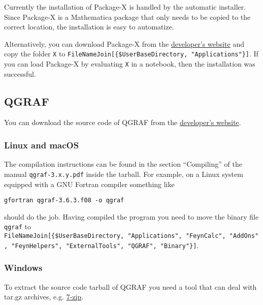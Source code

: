 \documentclass[../FeynHelpersManual.tex]{subfiles}
\begin{document}
Currently the installation of Package-X is handled by the automatic
installer. Since Package-X is a Mathematica package that only needs to
be copied to the correct location, the installation is easy to
automatize.

Alternatively, you can download Package-X from the
\href{https://packagex.hepforge.org/}{developer's website} and copy the
folder \texttt{X} to
\texttt{FileNameJoin[\allowbreak{}\{\allowbreak{}\$UserBaseDirectory,\ \allowbreak{}"Applications"\}]}.
If you can load Package-X by evaluating \texttt{X\textasciigrave } in a
notebook, then the installation was successful.

\hypertarget{qgraf}{%
\subsection{QGRAF}\label{qgraf}}

You can download the source code of QGRAF from the
\href{http://cfif.ist.utl.pt/~paulo/qgraf.html}{developer's website}.

\hypertarget{linux-and-macos}{%
\subsubsection{Linux and macOS}\label{linux-and-macos}}

The compilation instructions can be found in the section ``Compiling''
of the manual \texttt{qgraf-3.x.y.pdf} inside the tarball. For example,
on a Linux system equipped with a GNU Fortran compiler something like

\begin{verbatim}
gfortran qgraf-3.6.3.f08 -o qgraf
\end{verbatim}

should do the job. Having compiled the program you need to move the
binary file \texttt{qgraf} to
\texttt{FileNameJoin[\allowbreak{}\{\allowbreak{}\$UserBaseDirectory,\ \allowbreak{}"Applications",\ \allowbreak{}"FeynCalc",\ \allowbreak{}"AddOns",\ \allowbreak{}"FeynHelpers",\ \allowbreak{}"ExternalTools",\ \allowbreak{}"QGRAF",\ \allowbreak{}"Binary"\}]}.

\hypertarget{windows-4}{%
\subsubsection{Windows}\label{windows-4}}

To extract the source code tarball of QGRAF you need a tool that can
deal with tar.gz archives, e.g. \href{https://www.7-zip.org/}{7-zip}.
\end{document}
